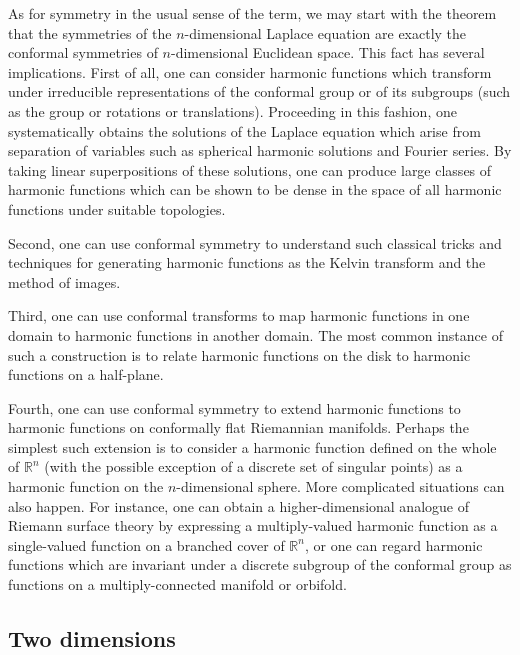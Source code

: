\documentclass[12pt]{article}
\begin{document}
As for symmetry in the usual sense of the term, we may start with the theorem that the symmetries of the $n$-dimensional Laplace equation are exactly the conformal symmetries of $n$-dimensional Euclidean space.  This fact has several implications.  First of all, one can consider harmonic functions which transform under irreducible representations of the conformal group or of its subgroups (such as the group or rotations or translations).  Proceeding in this fashion, one systematically obtains the solutions of the Laplace equation which arise from separation of variables such as spherical harmonic solutions and Fourier series.  By taking linear superpositions of these solutions, one can produce large classes of harmonic functions which can be shown to be dense in the space of all harmonic functions under suitable topologies.

Second, one can use conformal symmetry to understand such classical tricks and techniques for generating harmonic functions as the Kelvin transform and the method of images.

Third, one can use conformal transforms to map harmonic functions in one domain to harmonic functions in another domain.  The most common instance of such a construction is to relate harmonic functions on the disk to harmonic functions on a half-plane.

Fourth, one can use conformal symmetry to extend harmonic functions to harmonic functions on conformally flat Riemannian manifolds.  Perhaps the simplest such extension is to consider a harmonic function defined on the whole of $\mathbb{R}^n$ (with the possible exception of a discrete set of singular points) as a harmonic function on the $n$-dimensional sphere.  More complicated situations can also happen.  For instance, one can obtain a higher-dimensional analogue of Riemann surface theory by expressing a multiply-valued harmonic function as a single-valued function on a branched cover of $\mathbb{R}^n$, or one can regard harmonic functions which are invariant under a discrete subgroup of the conformal group as functions on a multiply-connected manifold or orbifold.

\subsection{Two dimensions}
\end{document}
